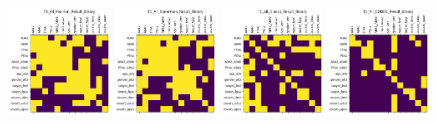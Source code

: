 \begin{figure}
    \includegraphics[width=0.24\textwidth]{diss/7_cond/figs/T1_All_Pearson_Result_Binary.png}
    \includegraphics[width=0.24\textwidth]{diss/7_cond/figs/T1_All_Spearman_Result_Binary.png}
    \includegraphics[width=0.24\textwidth]{diss/7_cond/figs/T1_All_Glasso_Result_Binary.png}
    \includegraphics[width=0.24\textwidth]{diss/7_cond/figs/T1_All_CODEC_Result_Binary.png}
    

\end{figure}
